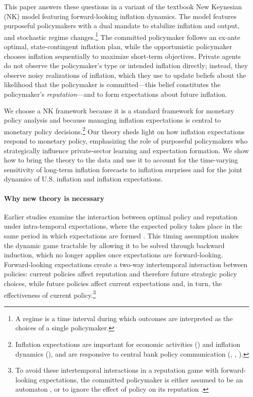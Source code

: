 \documentclass[12pt,letter,leqno]{article}
\theoremstyle{asn}
\theoremstyle{lem}
\theoremstyle{slem}
\theoremstyle{prop}
\theoremstyle{appprop}
\theoremstyle{rem}
\theoremstyle{defn}
\begin{document}
This paper answers these questions in a variant of the textbook New Keynesian (NK) model featuring forward-looking inflation dynamics. The model features purposeful policymakers with a dual mandate to stabilize inflation and output, and stochastic regime changes.\footnote{A regime is a time interval during which outcomes are interpreted as the choices of a single policymaker.} The committed policymaker follows an ex-ante optimal, state-contingent inflation plan, while the opportunistic policymaker chooses inflation sequentially to maximize short-term objectives. Private agents do not observe the policymaker's type or intended inflation directly; instead, they observe noisy realizations of inflation, which they use to update beliefs about the likelihood that the policymaker is committed—this belief constitutes the policymaker’s \textit{reputation}—and to form expectations about future inflation.  

We choose a NK framework because it is a standard framework for monetary policy
analysis and because managing inflation expectations is central to monetary
policy decisions.\footnote{Inflation expectations are important for economic
activities (\cite{coibion_how_2018}) and inflation dynamics
(\cite{beaudry_dominant_2024}), and are responsive to central bank policy
communication (\cite{hansen_first_2016}, \cite{haldane_central_2018},
\cite{blinder_central_2024}).} Our theory sheds light on how inflation
expectations respond to monetary policy, emphasizing the role of purposeful policymakers who 
strategically influence private-sector learning and expectation 
formation. We
show how to bring the theory to the data and use it to account for the
time-varying sensitivity of long-term inflation forecasts to inflation surprises
and for the joint dynamics of U.S. inflation and inflation expectations.



\paragraph{Why new theory is necessary} Earlier studies examine the interaction between optimal policy and reputation under intra-temporal expectations, where the expected policy takes place in the same period in which expectations are formed \citep{cukierman_optimal_1991, king_managing_2008, lu_optimal_2013, Dovis_2021}. This timing assumption makes the dynamic game tractable by allowing it to be solved through backward induction, which no longer applies once expectations are forward-looking. Forward-looking expectations create a two-way intertemporal interaction between policies: current policies affect reputation and therefore future strategic policy choices, while future policies affect current expectations and, in turn, the effectiveness of current policy.\footnote{To avoid these intertemporal interactions in a reputation game with forward-looking expectations, the committed policymaker is either assumed to be an automaton \citep{amador_reputation_2021, morelli_information_2023}, or to ignore the effect of policy on its reputation \citep{clayton_internationalizing_2025}.} 
\end{document}
